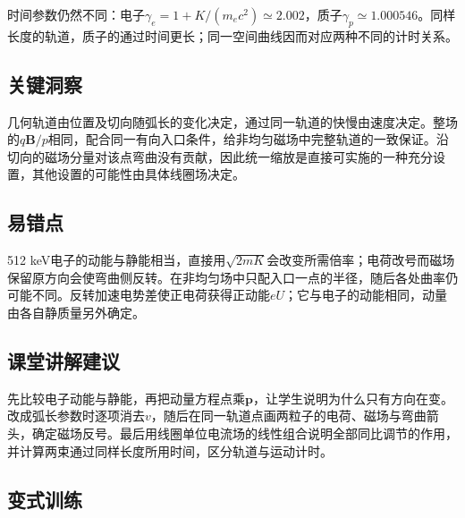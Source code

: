 \documentclass[UTF8,fontset=fandol,a4paper,11pt]{ctexart}
\begin{document}
时间参数仍然不同：电子$\gamma_e=1+K/(m_ec^2)\simeq2.002$，质子$\gamma_p\simeq1.000546$。同样长度的轨道，质子的通过时间更长；同一空间曲线因而对应两种不同的计时关系。




\subsection*{关键洞察}

几何轨道由位置及切向随弧长的变化决定，通过同一轨道的快慢由速度决定。整场的$q\boldsymbol B/p$相同，配合同一有向入口条件，给非均匀磁场中完整轨道的一致保证。沿切向的磁场分量对该点弯曲没有贡献，因此统一缩放是直接可实施的一种充分设置，其他设置的可能性由具体线圈场决定。



\subsection*{易错点}

512 keV电子的动能与静能相当，直接用$\sqrt{2mK}$会改变所需倍率；电荷改号而磁场保留原方向会使弯曲侧反转。在非均匀场中只配入口一点的半径，随后各处曲率仍可能不同。反转加速电势差使正电荷获得正动能$eU$；它与电子的动能相同，动量由各自静质量另外确定。



\subsection*{课堂讲解建议}

先比较电子动能与静能，再把动量方程点乘$\boldsymbol p$，让学生说明为什么只有方向在变。改成弧长参数时逐项消去$v$，随后在同一轨道点画两粒子的电荷、磁场与弯曲箭头，确定磁场反号。最后用线圈单位电流场的线性组合说明全部同比调节的作用，并计算两束通过同样长度所用时间，区分轨道与运动计时。



\subsection*{变式训练}
\end{document}
